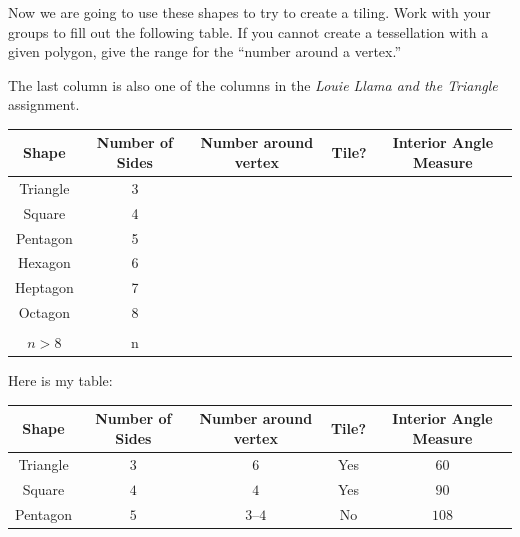 \documentclass[noauthor,nooutcomes,handout,12pt]{ximera}
\begin{document}
\begin{question}
 Now we are going to use these shapes to try to create a tiling. Work
 with your groups to fill out the following table.  If you cannot
 create a tessellation with a given polygon, give the range for the
 ``number around a vertex.''

The last column is also one of the columns in the \emph{Louie Llama and the Triangle} assignment.
\begin{center}
  \renewcommand{\arraystretch}{3}
\begin{tabular}{|c||c|c|c|c|}\hline
Shape & \begin{minipage}{1in} Number of Sides \end{minipage}& \begin{minipage}{1.5in}Number around vertex\end{minipage} & Tile? & \begin{minipage}{1.5in}Interior Angle Measure\end{minipage} \\ \hline\hline
Triangle & 3 &  &  & \\ \hline
Square & 4 &  &  & \\ \hline
Pentagon & 5  &  &  & \\ \hline
Hexagon & 6 &  &  & \\ \hline
Heptagon & 7 &  &  & \\ \hline
Octagon & 8 &  &  & \\ \hline\hline
\begin{minipage}{1in}
  \begin{center}
    $n$-gon\\ $n> 8$
  \end{center}
  \end{minipage} & n &  &  & \\ \hline
\end{tabular}
\end{center}
\begin{freeResponse}
  Here is my table:
  \begin{center}
  \renewcommand{\arraystretch}{3}
\begin{tabular}{|c||c|c|c|c|}\hline
Shape & Number of Sides & Number around vertex & Tile? & Interior Angle Measure \\ \hline\hline
Triangle & $3$ & $6$ & Yes  & $60$\\ \hline
Square & $4$ & $4$  & Yes  & $90$ \\ \hline
Pentagon & $5$ & $3$--$4$ & No & $108$ \\ \hline

\end{tabular}
\end{center}
\end{freeResponse}
\end{question}
\end{document}
